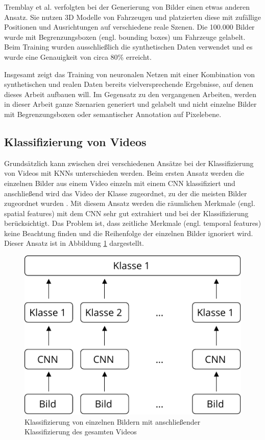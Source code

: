 Tremblay et al. \cite{tremblay2018training} verfolgten bei der Generierung von Bilder einen etwas anderen Ansatz. Sie nutzen 3D Modelle von Fahrzeugen und platzierten diese mit zufällige Positionen und Ausrichtungen auf verschiedene reale Szenen. Die 100.000 Bilder wurde mit Begrenzungsboxen (engl. bounding boxes) um Fahrzeuge gelabelt. Beim Training wurden ausschließlich die synthetischen Daten verwendet und es wurde eine Genauigkeit von circa 80\% erreicht.

Insgesamt zeigt das Training von neuronalen Netzen mit einer Kombination von synthetischen und realen Daten bereits vielversprechende Ergebnisse, auf denen dieses Arbeit aufbauen will. Im Gegensatz zu den vergangenen Arbeiten, werden in dieser Arbeit ganze Szenarien generiert und gelabelt und nicht einzelne Bilder mit Begrenzungsboxen oder semantischer Annotation auf Pixelebene.


\subsection{Klassifizierung von Videos}
\label{grundlagen_nn_video}

Grundsätzlich kann zwischen drei verschiedenen Ansätze bei der Klassifizierung von Videos mit \acp{KNN} unterschieden werden. Beim ersten Ansatz werden die einzelnen Bilder aus einem Video einzeln mit einem \ac{CNN} klassifiziert und anschließend wird das Video der Klasse zugeordnet, zu der die meisten Bilder zugeordnet wurden \cite{karpathy2014large}. Mit diesem Ansatz werden die räumlichen Merkmale (engl. spatial features) mit dem \ac{CNN} sehr gut extrahiert und bei der Klassifizierung berücksichtigt. Das Problem ist, dass zeitliche Merkmale (engl. temporal features) keine Beachtung finden und die Reihenfolge der einzelnen Bilder ignoriert wird. Dieser Ansatz ist in Abbildung \ref{fig_single_frame_classification} dargestellt.

\begin{figure}[h]
\centering
\includegraphics[scale=0.8]{images/single_frame_classification.pdf}
\caption{Klassifizierung von einzelnen Bildern mit anschließender Klassifizierung des gesamten Videos}
\label{fig_single_frame_classification}
\end{figure}

